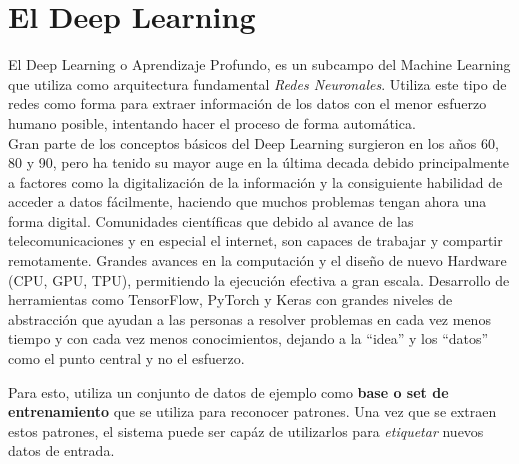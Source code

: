 \section{El Deep Learning}

El Deep Learning o Aprendizaje Profundo, es un subcampo del Machine Learning que utiliza como arquitectura fundamental
\emph{Redes Neuronales}. Utiliza este tipo de redes como forma para extraer información de los datos con el menor esfuerzo
humano posible, intentando hacer el proceso de forma automática.\\
Gran parte de los conceptos básicos del Deep Learning surgieron en los años 60, 80 y 90, pero ha tenido su mayor auge en la última
decada debido principalmente a factores como la digitalización de la información y la consiguiente habilidad de acceder a datos
fácilmente, haciendo que muchos problemas tengan ahora una forma digital. Comunidades científicas que debido al avance de las
telecomunicaciones y en especial el internet, son capaces de trabajar y compartir remotamente. Grandes avances en la computación
y el diseño de nuevo Hardware (CPU, GPU, TPU), permitiendo la ejecución efectiva a gran escala. Desarrollo de herramientas
como TensorFlow, PyTorch y Keras con grandes niveles de abstracción que ayudan a las personas a resolver
problemas en cada vez menos tiempo y con cada vez menos conocimientos, dejando a la ``idea'' y los ``datos'' como el punto central
y no el esfuerzo.

Para esto, utiliza un conjunto de datos de ejemplo como \textbf{base o set de entrenamiento} que se utiliza para reconocer
patrones. Una vez que se extraen estos patrones, el sistema puede ser capáz de utilizarlos para \emph{etiquetar} nuevos
datos de entrada.\\






